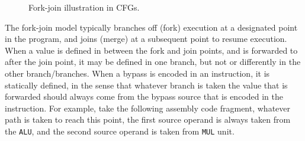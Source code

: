 \begin{figure}[b!]
\centering
{}
\hfil
{}
\caption{Fork-join illustration in CFGs.}
\label{fig:fork_join_ill}
\end{figure}

The fork-join model typically branches off (fork) execution at a designated point in the program, and joins (merge) at a subsequent point to resume execution. %
When a value is defined in between the fork and join points, and is forwarded to after the join point, it may be defined in one branch, but not or differently in the other branch/branches. When a bypass is encoded in an instruction, it is statically defined, in the sense that whatever branch is taken the value that is forwarded should always come from the bypass source that is encoded in the instruction. For example, take the following assembly code fragment, whatever path is taken to reach this point, the first source operand is always taken from the \texttt{ALU}, and the second source operand is taken from \texttt{MUL} unit.

